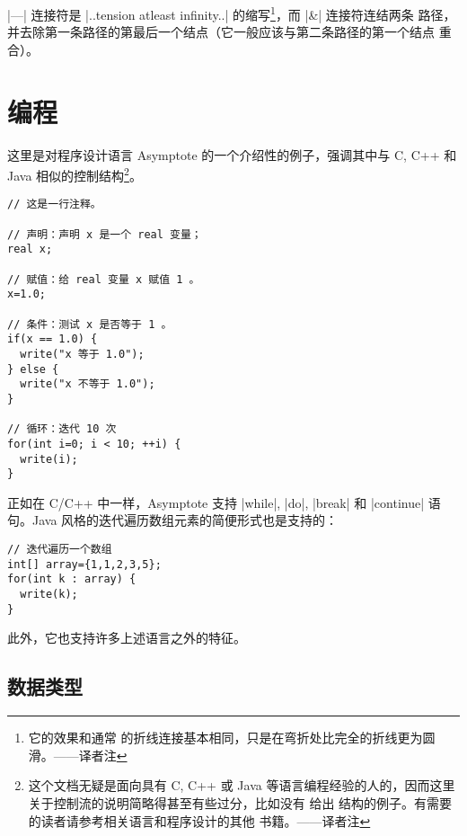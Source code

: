 \documentclass[nofonts,CJKnormalspaces]{ctexbook}[2009/05/20]
\newcommand*\prgname[1]{\textsf{#1}}
\newcommand\transnote[1]{\footnote{#1——译者注}}
\begin{document}
|---| 连接符是 |..tension atleast infinity..| 的缩写\transnote{它的效果和通常
的折线连接基本相同，只是在弯折处比完全的折线更为圆滑。}，而 |&| 连接符连结两条
路径，并去除第一条路径的第最后一个结点（它一般应该与第二条路径的第一个结点
重合）。


\chapter{编程}
\label{chap:programming}

这里是对程序设计语言 \prgname{Asymptote} 的一个介绍性的例子，强调其中与
C, C++ 和 Java 相似的控制结构\transnote{这个文档无疑是面向具有 C, C++ 或 Java
等语言编程经验的人的，因而这里关于控制流的说明简略得甚至有些过分，比如没有
给出 \inlinecode{do} 结构的例子。有需要的读者请参考相关语言和程序设计的其他
书籍。}。

\begin{lstlisting}
// 这是一行注释。

// 声明：声明 x 是一个 real 变量；
real x;

// 赋值：给 real 变量 x 赋值 1 。
x=1.0;

// 条件：测试 x 是否等于 1 。
if(x == 1.0) {
  write("x 等于 1.0");
} else {
  write("x 不等于 1.0");
}

// 循环：迭代 10 次
for(int i=0; i < 10; ++i) {
  write(i);
}
\end{lstlisting}

正如在 C/C++ 中一样，\prgname{Asymptote} 支持 |while|, |do|, |break| 和
|continue| 语句。Java 风格的迭代遍历数组元素的简便形式也是支持的：
\begin{lstlisting}
// 迭代遍历一个数组
int[] array={1,1,2,3,5};
for(int k : array) {
  write(k);
}
\end{lstlisting}
此外，它也支持许多上述语言之外的特征。


\section{数据类型}
\end{document}
